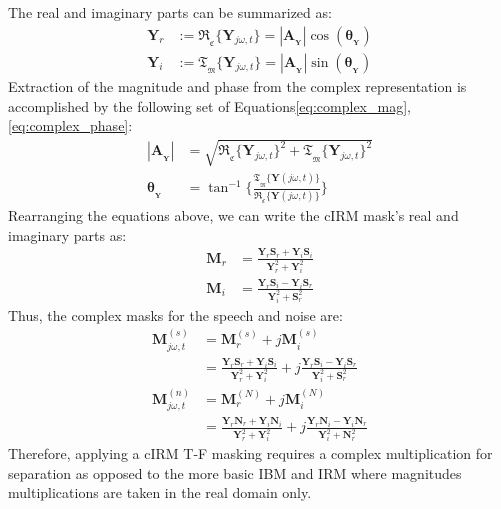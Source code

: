The real and imaginary parts can be summarized as:
\begin{align}
    \mathbf{Y}_{r} & := \mathfrak{R}_{_{\mathfrak{C}}} \{\mathbf{Y}_{j\omega, t}\} 
                            = |\mathbf{A}_{_{\mathbf{Y}}}|\cos(\bm{\theta}_{_{\mathbf{Y}}})  \\
    \mathbf{Y}_{i} & := \mathfrak{T}_{_{\mathfrak{M}}} \{\mathbf{Y}_{j\omega, t}\} 
                            = |\mathbf{A}_{_{\mathbf{Y}}}|\sin(\bm{\theta}_{_{\mathbf{Y}}})
\end{align}
Extraction of the magnitude and phase from the complex representation 
is accomplished by the following set of 
Equations\ref{eq:complex_mag},\ref{eq:complex_phase}:
\begin{align}\label{eq:complex_mag}
    |\mathbf{A}_{_{\mathbf{Y}}}|    & = \sqrt{ \mathfrak{R}_{_{\mathfrak{C}}} \{\mathbf{Y}_{j\omega, t}\}^{2}
                                            + \mathfrak{T}_{_{\mathfrak{M}}} \{\mathbf{Y}_{j\omega, t}\}^{2} } \\
    \label{eq:complex_phase}\bm{\theta}_{_{\mathbf{Y}}}     & = \tan^{-1} \Bigg\{ \frac{ \mathfrak{T}_{_{\mathfrak{M}}} \{\mathbf{Y}(j\omega, t)\} }
                                            {\mathfrak{R}_{_{\mathfrak{C}}} \{\mathbf{Y}(j\omega, t)\}} \Bigg\}
\end{align}
Rearranging the equations above, 
we can write the cIRM mask's real and 
imaginary parts as:
\begin{align}
    \mathbf{M}_{r} & = \frac{\mathbf{Y}_{r}\mathbf{S}_{r} + \mathbf{Y}_{i}\mathbf{S}_{i}}
                            { \mathbf{Y}_{r}^{2} + \mathbf{Y}_{i}^{2}} \\
    \mathbf{M}_{i} & = \frac{\mathbf{Y}_{r}\mathbf{S}_{i} - \mathbf{Y}_{i}\mathbf{S}_{r}}
                            { \mathbf{Y}_{i}^{2} + \mathbf{S}_{r}^{2}}
\end{align}
Thus, the complex masks for the speech and noise are: 
\begin{align}
    \mathbf{M}^{(s)}_{j\omega, t} & = \mathbf{M}^{(s)}_{r} + j\mathbf{M}^{(s)}_{i} \nonumber \\
            & = \frac{\mathbf{Y}_{r}\mathbf{S}_{r} + \mathbf{Y}_{i}\mathbf{S}_{i}}
            { \mathbf{Y}_{r}^{2} + \mathbf{Y}_{i}^{2}} 
            + j \frac{\mathbf{Y}_{r}\mathbf{S}_{i} - \mathbf{Y}_{i}\mathbf{S}_{r}}
            { \mathbf{Y}_{i}^{2} + \mathbf{S}_{r}^{2}} \label{eq:cirmr_mask} \\
    \mathbf{M}^{(n)}_{j\omega, t} & = \mathbf{M}^{(N)}_{r} + j\mathbf{M}^{(N)}_{i} \nonumber \\
    & = \frac{\mathbf{Y}_{r}\mathbf{N}_{r} + \mathbf{Y}_{i}\mathbf{N}_{i}}
    { \mathbf{Y}_{r}^{2} + \mathbf{Y}_{i}^{2}} 
    + j \frac{\mathbf{Y}_{r}\mathbf{N}_{i} - \mathbf{Y}_{i}\mathbf{N}_{r}}
    { \mathbf{Y}_{i}^{2} + \mathbf{N}_{r}^{2}} \label{eq:cirmi_mask}
\end{align}
Therefore, applying a cIRM T-F masking requires a complex multiplication
for separation as opposed to the more basic IBM and IRM 
where magnitudes multiplications are taken in the real domain only.

